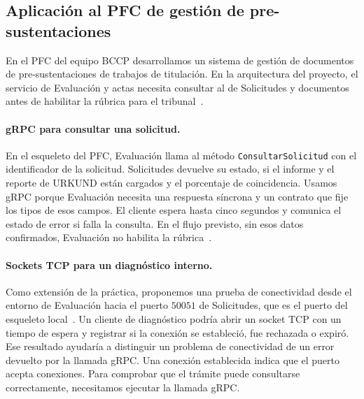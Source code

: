\subsection{Aplicación al PFC de gestión de pre-sustentaciones}

En el PFC del equipo BCCP desarrollamos un sistema de gestión de
documentos de pre-sustentaciones de trabajos de titulación. En la
arquitectura del proyecto, el servicio de Evaluación y actas necesita
consultar al de Solicitudes y documentos antes de habilitar la rúbrica
para el tribunal~\cite{pfcBccpComunicacion}.

\paragraph{gRPC para consultar una solicitud.}
En el esqueleto del PFC, Evaluación llama al método
\texttt{ConsultarSolicitud} con el identificador de la solicitud.
Solicitudes devuelve su estado, si el informe y el reporte de URKUND
están cargados y el porcentaje de coincidencia. Usamos gRPC porque
Evaluación necesita una respuesta síncrona y un contrato que fije los
tipos de esos campos. El cliente espera hasta cinco segundos y
comunica el estado de error si falla la consulta. En el flujo previsto,
sin esos datos confirmados, Evaluación no habilita la
rúbrica~\cite{pfcBccpRepositorio,pfcBccpComunicacion}.

\paragraph{Sockets TCP para un diagnóstico interno.}
Como extensión de la práctica, proponemos una prueba de conectividad
desde el entorno de Evaluación hacia el puerto \(50051\) de Solicitudes,
que es el puerto del esqueleto local~\cite{pfcBccpRepositorio}.
Un cliente de diagnóstico podría abrir un socket TCP con un tiempo de
espera y registrar si la conexión se estableció, fue rechazada o expiró.
Ese resultado ayudaría a distinguir un problema de conectividad de un
error devuelto por la llamada gRPC. Una conexión establecida indica que
el puerto acepta conexiones. Para comprobar que el trámite puede
consultarse correctamente, necesitamos ejecutar la llamada gRPC.
